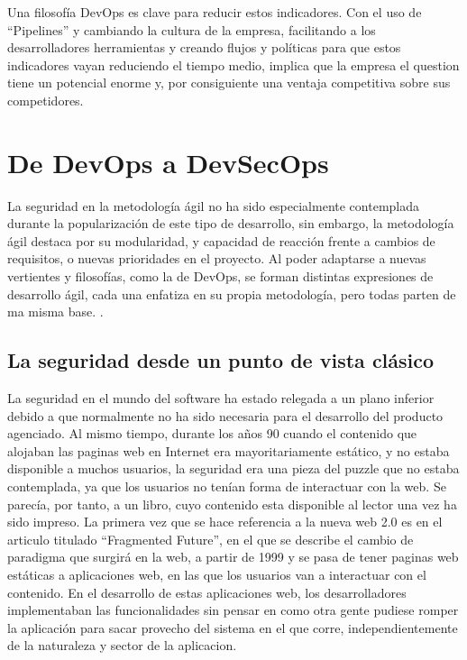 \documentclass[12pt]{report} %
\begin{document}
Una filosofía DevOps es clave para reducir estos indicadores.  Con el uso de
``Pipelines'' y cambiando la cultura de la empresa, facilitando a los
desarrolladores herramientas y creando flujos y políticas para que estos
indicadores vayan reduciendo el tiempo medio, implica que la empresa el question
tiene un potencial enorme y, por consiguiente una ventaja competitiva sobre sus
competidores.

\section{De DevOps a DevSecOps}

La seguridad en la metodología ágil no ha sido especialmente contemplada durante
la popularización de este tipo de desarrollo, sin embargo, la metodología ágil
destaca por su modularidad, y capacidad de reacción frente a cambios de
requisitos, o nuevas prioridades en el proyecto.  Al poder adaptarse a nuevas
vertientes y filosofías, como la de DevOps, se forman distintas expresiones de
desarrollo ágil, cada una enfatiza en su propia metodología, pero todas parten
de ma misma base. \cite{agilePrinciples}.

\subsection{La seguridad desde un punto de vista clásico}
 
La seguridad en el mundo del software ha estado relegada a un plano inferior
debido a que normalmente no ha sido necesaria para el desarrollo del producto
agenciado.  Al mismo tiempo, durante los años 90 cuando el contenido que
alojaban las paginas web en Internet era mayoritariamente estático, y no estaba
disponible a muchos usuarios, la seguridad era una pieza del puzzle que no
estaba contemplada, ya que los usuarios no tenían forma de interactuar con la
web.  Se parecía, por tanto, a un libro, cuyo contenido esta disponible al
lector una vez ha sido impreso.  La primera vez que se hace referencia a la
nueva web 2.0 es en el articulo titulado ``Fragmented Future'', en el que se
describe el cambio de paradigma que surgirá en la web, a partir de 1999 y se
pasa de tener paginas web estáticas a aplicaciones web, en las que los usuarios
van a interactuar con el contenido. \cite{DiNucci1999} En el desarrollo de estas
aplicaciones web, los desarrolladores implementaban las funcionalidades sin
pensar en como otra gente pudiese romper la aplicación para sacar provecho del
sistema en el que corre, independientemente de la naturaleza y sector de la
aplicacion.
\end{document}
